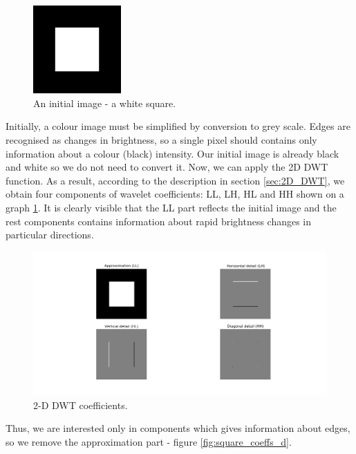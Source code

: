 \begin{figure}[h]
	\centering
	\includegraphics[width=0.3\textwidth]{graphs/square.png}
	\caption{An initial image - a white square.}
\end{figure}

Initially, a colour image must be simplified by conversion to grey scale. Edges are recognised as changes in brightness, so a single pixel should contains only information about a colour (black) intensity. Our initial image is already black and white so we do not need to convert it. Now, we can apply the 2D DWT function. As a result, according to the description in section \ref{sec:2D_DWT}, we obtain four components of wavelet coefficients: LL, LH, HL and HH shown on a graph \ref{fig:square_coeffs}. It is clearly visible that the LL part reflects the initial image and the rest components contains information about rapid brightness changes in particular directions. 

\begin{figure}[h]
	\centering
	\includegraphics[width=\textwidth]{graphs/square_db2_coeffs.png}
	\caption{2-D DWT coefficients.}
	\label{fig:square_coeffs}
\end{figure}

Thus, we are interested only in components which gives information about edges, so we remove the approximation part - figure \ref{fig:square_coeffs_d}.


